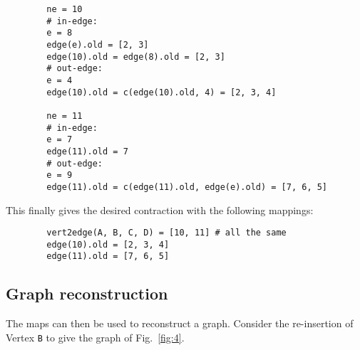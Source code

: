     \begin{lstlisting}
        ne = 10
        # in-edge:
        e = 8
        edge(e).old = [2, 3]
        edge(10).old = edge(8).old = [2, 3]
        # out-edge:
        e = 4
        edge(10).old = c(edge(10).old, 4) = [2, 3, 4]

        ne = 11
        # in-edge:
        e = 7
        edge(11).old = 7
        # out-edge:
        e = 9
        edge(11).old = c(edge(11).old, edge(e).old) = [7, 6, 5]
    \end{lstlisting}
    This finally gives the desired contraction with the following mappings:
    \begin{lstlisting}
        vert2edge(A, B, C, D) = [10, 11] # all the same
        edge(10).old = [2, 3, 4]
        edge(11).old = [7, 6, 5]
    \end{lstlisting}


    

    \vspace{12pt}\subsection{Graph reconstruction}

    \noindent The maps can then be used to reconstruct a graph. Consider the re-insertion of Vertex {\tt B} to give the graph of
    Fig.~\ref{fig:4}.
    
    

